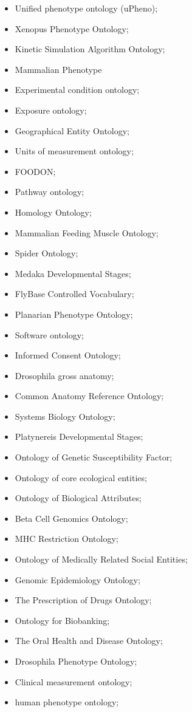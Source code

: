 \documentclass{cisfyp}
\begin{document}
\begin{appendices}
\begin{multicols}{2}
\begin{itemize}
	\item Unified phenotype ontology (uPheno); \item Xenopus Phenotype Ontology; \item Kinetic Simulation Algorithm Ontology; \item Mammalian Phenotype
	\item Experimental condition ontology; \item Exposure ontology; \item Geographical Entity Ontology; \item Units of measurement ontology; \item FOODON; \item Pathway ontology;
	\item Homology Ontology; \item Mammalian Feeding Muscle Ontology; \item Spider Ontology; \item Medaka Developmental Stages; \item FlyBase Controlled Vocabulary; \item Planarian Phenotype Ontology; \item Software ontology; \item Informed Consent Ontology;
	\item Drosophila gross anatomy; \item Common Anatomy Reference Ontology; \item Systems Biology Ontology; \item Platynereis Developmental Stages; \item Ontology of Genetic Susceptibility Factor; \item Ontology of core ecological entities; 
	\item Ontology of Biological Attributes; \item Beta Cell Genomics Ontology; \item MHC Restriction Ontology; \item Ontology of Medically Related Social Entities; \item Genomic Epidemiology Ontology;
	\item The Prescription of Drugs Ontology; \item Ontology for Biobanking; \item The Oral Health and Disease Ontology; \item Drosophila Phenotype Ontology; \item Clinical measurement ontology; \item human phenotype ontology;

\end{itemize}
\end{multicols}
\end{appendices}
\end{document}
